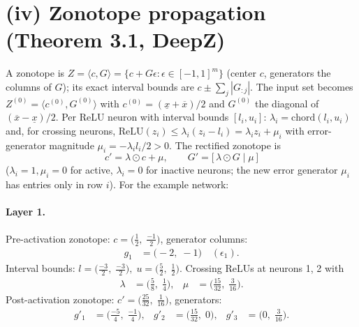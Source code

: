 \documentclass[11pt]{article}
\begin{document}
\section{(iv) Zonotope propagation (Theorem 3.1, DeepZ)}
A zonotope is $Z = \langle c, G \rangle = \{c + G\epsilon : \epsilon \in [-1,1]^m\}$
(center $c$, generators the columns of $G$); its exact interval bounds are
$c \pm \sum_j |G_{:j}|$. The input set becomes $Z^{(0)} = \langle c^{(0)}, G^{(0)} \rangle$ with
$c^{(0)} = (\underline{x} + \overline{x})/2$ and $G^{(0)}$ the diagonal of $(\overline{x} - \underline{x})/2$.
Per ReLU neuron with interval bounds $[l_i, u_i]$:
$\lambda_i = \mathrm{chord}(l_i, u_i)$ and, for crossing neurons,
$\mathrm{ReLU}(z_i) \le \lambda_i (z_i - l_i) = \lambda_i z_i + \mu_i$ with error-generator magnitude
$\mu_i = -\lambda_i l_i / 2 > 0$. The rectified zonotope is
\begin{equation*}
c' = \lambda \odot c + \mu, \qquad G' = \bigl[\, \lambda \odot G \;\big|\; \mu\, \bigr]
\end{equation*}
($\lambda_i = 1, \mu_i = 0$ for active, $\lambda_i = 0$ for inactive neurons;
the new error generator $\mu_i$ has entries only in row $i$).
For the example network:
\paragraph{Layer 1.}
Pre-activation zonotope: $c = \bigl(\frac{1}{2},\; \frac{-1}{2}\bigr)$, generator columns:
\begin{align*}
g_{1} &= \bigl(-2,\; -1\bigr) \quad (\epsilon_{1}).
\end{align*}
Interval bounds: $l = \bigl(\frac{-3}{2},\; \frac{-3}{2}\bigr), \; u = \bigl(\frac{5}{2},\; \frac{1}{2}\bigr)$. 
Crossing ReLUs at neurons 1, 2 with
\begin{align*}
\lambda &= \bigl(\frac{5}{8},\; \frac{1}{4}\bigr), & \mu &= \bigl(\frac{15}{32},\; \frac{3}{16}\bigr).
\end{align*}
Post-activation zonotope: $c' = \bigl(\frac{25}{32},\; \frac{1}{16}\bigr)$, generators:
\begin{align*}
g'_{1} &= \bigl(\frac{-5}{4},\; \frac{-1}{4}\bigr), &
g'_{2} &= \bigl(\frac{15}{32},\; 0\bigr), &
g'_{3} &= \bigl(0,\; \frac{3}{16}\bigr).
\end{align*}
\end{document}
